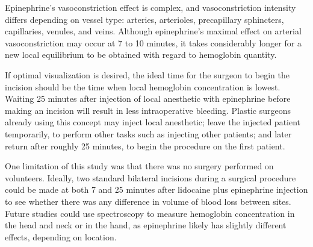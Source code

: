 Epinephrine's vasoconstriction effect is complex, and vasoconstriction intensity differs depending on vessel type: arteries, arterioles, precapillary sphincters, capillaries, venules, and veins.\cite{Lee1050} Although epinephrine's maximal effect on arterial vasoconstriction may occur at 7 to 10 minutes, it takes considerably longer for a new local equilibrium to be obtained with regard to hemoglobin quantity.

If optimal visualization is desired, the ideal time for the surgeon to begin the incision should be the time when local hemoglobin concentration is lowest. Waiting 25 minutes after injection of local anesthetic with epinephrine before making an incision will result in less intraoperative bleeding. Plastic surgeons already using this concept may inject local anesthetic; leave the injected patient temporarily, to perform other tasks such as injecting other patients; and later return after roughly 25 minutes, to begin the procedure on the first patient.\cite{Gibson1990}

One limitation of this study was that there was no surgery performed on volunteers. Ideally, two standard bilateral incisions during a surgical procedure could be made at both 7 and 25 minutes after lidocaine plus epinephrine injection to see whether there was any difference in volume of blood loss between sites. Future studies could use spectroscopy to measure hemoglobin concentration in the head and neck or in the hand, as epinephrine likely has slightly different effects, depending on location.